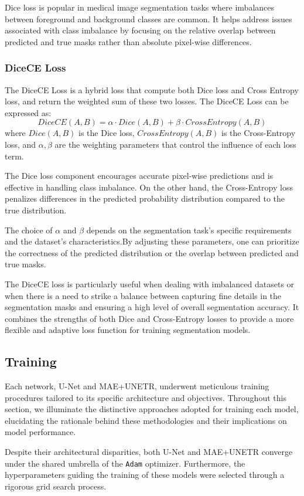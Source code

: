 Dice loss is popular in medical image segmentation tasks where imbalances between foreground and background classes are common. It helps address issues associated with class imbalance by focusing on the relative overlap between predicted and true masks rather than absolute pixel-wise differences.

\subsubsection{DiceCE Loss}
The DiceCE Loss is a hybrid loss that compute both Dice loss and Cross Entropy loss, and return the weighted sum of these two losses.
The DiceCE Loss can be expressed as:
$$DiceCE(A,B) = \alpha \cdot Dice(A,B) + \beta \cdot CrossEntropy(A,B)$$
where $Dice(A,B)$ is the Dice loss, $CrossEntropy(A,B)$ is the Cross-Entropy loss, and $\alpha, \beta$ are the weighting parameters that control the influence of each loss term.

The Dice loss component encourages accurate pixel-wise predictions and is effective in handling class imbalance. On the other hand, the Cross-Entropy loss penalizes differences in the predicted probability distribution compared to the true distribution.

The choice of $\alpha$ and $\beta$ depends on the segmentation task's specific requirements and the dataset's characteristics.By adjusting these parameters, one can prioritize the correctness of the predicted distribution or the overlap between predicted and true masks.

The DiceCE loss is particularly useful when dealing with imbalanced datasets or when there is a need to strike a balance between capturing fine details in the segmentation masks and ensuring a high level of overall segmentation accuracy. It combines the strengths of both Dice and Cross-Entropy losses to provide a more flexible and adaptive loss function for training segmentation models.

\subsection{Training}
Each network, U-Net and MAE+UNETR, underwent meticulous training procedures tailored to its specific architecture and objectives. Throughout this section, we illuminate the distinctive approaches adopted for training each model, elucidating the rationale behind these methodologies and their implications on model performance.

Despite their architectural disparities, both U-Net and MAE+UNETR converge under the shared umbrella of the \texttt{Adam} optimizer. Furthermore, the hyperparameters guiding the training of these models were selected through a rigorous grid search process.
